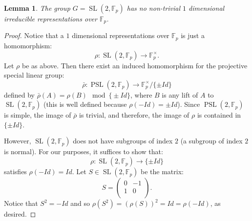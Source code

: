 \documentclass[12pt]{article}
\newtheorem*{lemma}{Lemma}
\theoremstyle{definition}
\newcommand{\SL}{\operatorname{SL}}
\newcommand{\PSL}{\operatorname{PSL}}
\newcommand{\arrow}{\longrightarrow}
\newcommand{\F}{\mathbb{F}_p}
\begin{document}
\begin{lemma}
The group $G=\SL(2,\F)$ has no non-trivial $1$ dimensional irreducible representations over $\F$.
\end{lemma}
\begin{proof}
Notice that a $1$ dimensional representations over $\F$ is just a homomorphism:
$$\rho \colon \SL(2,\F)\arrow \mathbb{F}_p^\times.$$
Let $\rho$ be as above. Then there exist an induced homomorphism for the projective special linear group:
$$\bar{\rho} \colon \PSL(2,\F) \arrow \mathbb{F}_p^\times/\{ \pm \mathit{Id} \}$$
defined by $\bar{\rho}(A)=\rho(B) \mod \{ \pm \mathit{Id} \}$, where $B$ is any lift of $A$ to $\SL(2,\F)$ (this is well defined because $\rho(-\mathit{Id})=\pm \mathit{Id}$). Since $\PSL(2,\F)$ is simple, the image of $\bar{\rho}$ is trivial, and therefore, the image of $\rho$ is contained in $\{ \pm \mathit{Id} \}$. 

However, $\SL(2,\F)$ does not have subgroups of index $2$ (a subgroup of index $2$ is normal). For our purposes, it suffices to show that:
$$\rho\colon \SL(2,\F)\arrow \{\pm \mathit{Id} \}$$
satisfies $\rho(-\mathit{Id})=\mathit{Id}$. Let $S\in\SL(2,\F)$ be the matrix:
$$S=\left(%
\begin{array}{cc}
  0 & -1 \\
  1 & 0 \\
\end{array}%
\right).$$
Notice that $S^2=-\mathit{Id}$ and so $\rho(S^2)=(\rho(S))^2=\mathit{Id}=\rho(-\mathit{Id})$, as desired. 
\end{proof}
\end{document}
